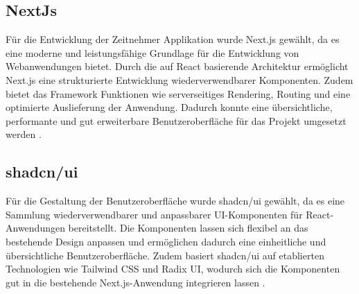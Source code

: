 \subsection{NextJs}
Für die Entwicklung der Zeitnehmer Applikation wurde Next.js gewählt, da es eine moderne und leistungsfähige Grundlage für die Entwicklung von Webanwendungen bietet. Durch die auf React basierende Architektur ermöglicht Next.js eine strukturierte Entwicklung wiederverwendbarer Komponenten. Zudem bietet das Framework Funktionen wie serverseitiges Rendering, Routing und eine optimierte Auslieferung der Anwendung. Dadurch konnte eine übersichtliche, performante und gut erweiterbare Benutzeroberfläche für das Projekt umgesetzt werden \cite{nextjs_docs}.

\subsection{shadcn/ui}
Für die Gestaltung der Benutzeroberfläche wurde shadcn/ui gewählt, da es eine Sammlung wiederverwendbarer und anpassbarer UI-Komponenten für React-Anwendungen bereitstellt. Die Komponenten lassen sich flexibel an das bestehende Design anpassen und ermöglichen dadurch eine einheitliche und übersichtliche Benutzeroberfläche. Zudem basiert shadcn/ui auf etablierten Technologien wie Tailwind CSS und Radix UI, wodurch sich die Komponenten gut in die bestehende Next.js-Anwendung integrieren lassen \cite{shadcn_ui_docs}.